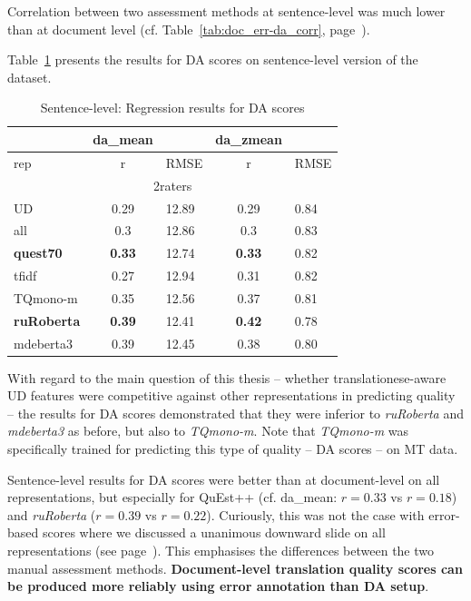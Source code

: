 Correlation between two assessment methods at sentence-level was much lower than at document level (cf. Table~\ref{tab:doc_err-da_corr}, page~\pageref{tab:doc_err-da_corr}).

Table~\ref{tab:da_sent_res} presents the results for DA scores on sentence-level version of the dataset. 

\begin{table}[H]
	\centering
	\begin{tabular}{l|cl|cl}
		\toprule
		& da\_mean &      & da\_zmean &      \\
		\midrule
		rep             & r         & RMSE & r          & RMSE \\
		\midrule
		\multicolumn{5}{c}{2raters}     \\ 
		\midrule
		UD              & 0.29 & 12.89 & 0.29 & 0.84 \\
		all             & 0.3  & 12.86 & 0.3  & 0.83 \\
		\textbf{quest70}         & \textbf{0.33} & 12.74 & \textbf{0.33} & 0.82 \\
		\midrule
		tfidf           & 0.27 & 12.94 & 0.31 & 0.82 \\
		\midrule
		TQmono-m        & 0.35 & 12.56 & 0.37 & 0.81 \\
		\textbf{ruRoberta} & \textbf{0.39} & 12.41 & \boxit{0.4in}\textbf{0.42} & 0.78 \\
		mdeberta3  & 0.39 & 12.45 & 0.38 & 0.80 \\
		\bottomrule
	\end{tabular}
	\caption{\label{tab:da_sent_res}Sentence-level: Regression results for DA scores}
\end{table}

With regard to the main question of this thesis -- whether translationese-aware UD features were competitive against other representations in predicting quality -- the results for DA scores demonstrated that they were inferior to \textit{ruRoberta} and \textit{mdeberta3} as before, but also to \textit{TQmono-m}. Note that \textit{TQmono-m} was specifically trained for predicting this type of quality -- DA scores -- on MT data. 

\label{pg:no_slide_for_da_when_moving_to_sent}
Sentence-level results for DA scores were better than at document-level on all representations, but especially for QuEst++ (cf. da\_mean: $r=0.33$ vs $r=0.18$) and \textit{ruRoberta} ($r=0.39$ vs $r=0.22$). Curiously, this was not the case with error-based scores where we discussed a unanimous downward slide on all representations (see page~\pageref{pg:downward_slide}). 
This emphasises the differences between the two manual assessment methods. \textbf{Document-level translation quality scores can be produced more reliably using error annotation than DA setup}. 

